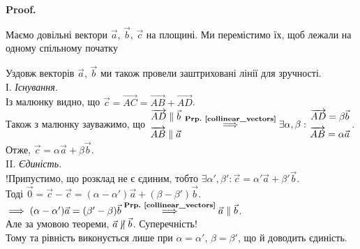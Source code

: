\documentclass[a4paper, 10pt]{extarticle}
\makeatletter
\def\qed{$\blacksquare$}
\newcommand\prpref[1]{\textbf{Prp.~\ref{#1}}}
\def\qed{$\blacksquare$}
\theoremstyle{theoremdd}
\theoremstyle{theoremdd}
\theoremstyle{theoremdd}
\theoremstyle{theoremdd}
\theoremstyle{theoremdd}
\theoremstyle{theoremdd}
\theoremstyle{theoremdd}
\theoremstyle{theoremdd}
\renewenvironment{proof}[1][Proof.\\]{\par
\pushQED{\hfill \qed}%
\normalfont \topsep6\p@\@plus6\p@\relax
\trivlist
\item\relax
{\bfseries
#1\@addpunct{.}}\hspace\labelsep\ignorespaces
}{%
\popQED\endtrivlist\@endpefalse
}
\makeatother
\begin{document}
\begin{proof}
	Маємо довільні вектори $\vec{a}$, $\vec{b}$, $\vec{c}$ на площині. Ми перемістимо їх, щоб лежали на одному спільному початку
\begin{figure}[H]
\centering
\end{figure}
	Уздовж векторів $\vec{a}$, $\vec{b}$ ми також провели заштриховані лінії для зручності.\\
І. \textit{Існування.}\\
	Із малюнку видно, що $\vec{c} = \overrightarrow{AC} = \overrightarrow{AB} + \overrightarrow{AD}$.\\
	Також з малюнку зауважимо, що $\left. \begin{gathered} \overrightarrow{AD} \parallel \vec{b} \\ \overrightarrow{AB} \parallel \vec{a} \end{gathered} \right. \overset{\textrm{\prpref{collinear_vectors}}}{\implies} \exists \alpha, \beta: \left. \begin{gathered} \overrightarrow{AD} = \beta \vec{b} \\ \overrightarrow{AB} = \alpha \vec{a} \end{gathered} \right.$.\\
	Отже, $\vec{c} = \alpha \vec{a} + \beta \vec{b}$.
\bigskip \\
II. \textit{Єдиність.}\\
!Припустимо, що розклад не є єдиним, тобто $\exists \alpha', \beta': \vec{c} = \alpha' \vec{a} + \beta' \vec{b}$.\\
	Тоді $\vec{0} = \vec{c} - \vec{c} = (\alpha-\alpha') \vec{a} + (\beta - \beta') \vec{b}$.\\
	$\implies (\alpha-\alpha')\vec{a} = (\beta' - \beta)\vec{b} \overset{\textrm{\prpref{collinear_vectors}}}{\implies} \vec{a} \parallel \vec{b}$.\\
	Але за умовою теореми, $\vec{a} \centernot\parallel \vec{b}$. Суперечність!\\ Тому та рівність виконується лише при $\alpha = \alpha'$, $\beta = \beta'$, що й доводить єдиність.
\end{proof}
\end{document}
